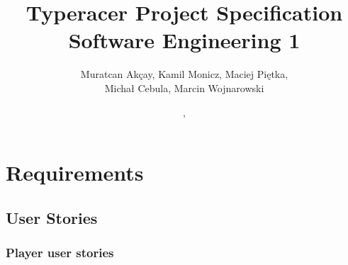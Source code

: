\documentclass{article}
\title{Typeracer Project Specification \\ \large Software Engineering 1}
\author{Muratcan Akçay, Kamil Monicz, Maciej Piętka,\\ Michał Cebula, Marcin Wojnarowski}
\date{\monthname, \the\year}
\begin{document}
\maketitle

\tableofcontents

\section{Requirements}

\subsection{User Stories}

\subsubsection{Player user stories}

\newcommand{\AC}{\subitem AC. }
\end{document}

